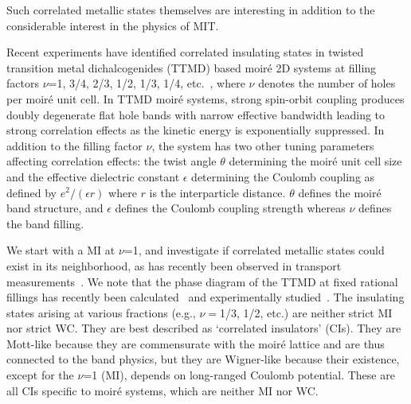 \documentclass[aps,prl,floatfix,twocolumn]{revtex4-2}
\begin{document}
Such correlated metallic states {themselves are interesting} in addition to the considerable interest in the physics of {MIT}.


Recent experiments have identified correlated insulating states in twisted transition metal dichalcogenides (TTMD) based moir\'e 2D systems at filling factors $\nu$=1, 3/4, 2/3, 1/2, 1/3, 1/4, etc.~\cite{ huang2021correlated,jin2021stripe,xu2020correlated,zhang2020flat,tang2020simulation,regan2020mott,wang2020correlated}{, where $ \nu $ denotes the number of holes per moir\'e unit cell.}
In TTMD moir\'e systems, strong spin-orbit coupling produces doubly degenerate flat hole bands with narrow effective bandwidth leading to strong correlation effects as the kinetic energy is exponentially suppressed.  In addition to the filling factor $\nu$, the system has two other tuning parameters affecting correlation effects: the twist angle $\theta$ determining the moir\'e unit cell size and the effective dielectric constant $\epsilon$ determining the Coulomb coupling as defined by $ e^2/(\epsilon r) $ where $r$ is the interparticle distance.  $\theta$ defines the moir\'e band structure, and $\epsilon$ defines the Coulomb coupling strength whereas $\nu$ defines the band filling.


{We start with a MI at $ \nu $=1,} and investigate if correlated metallic states could exist in its neighborhood, as has recently been observed in transport measurements~\cite{wang2020correlated}.  We note that the phase diagram of the {TTMD} at fixed rational fillings has recently been calculated~\cite{pan2020quantum} and experimentally studied~\cite{jin2021stripe,xu2020correlated}. The insulating states arising at various fractions (e.g., $\nu=$1/3, 1/2, etc.) are neither strict MI nor strict WC. They are {best described} as `correlated insulators’ {(CIs)}.  They are Mott-like {because} they are commensurate with the moir\'e lattice and are thus connected to the band physics, but they are Wigner-like {because} their existence, except for the $\nu$=1 {(MI)}, depends on {long-ranged Coulomb potential.} These are all {CIs} specific to moir\'e systems, which are neither MI nor WC.
\end{document}
